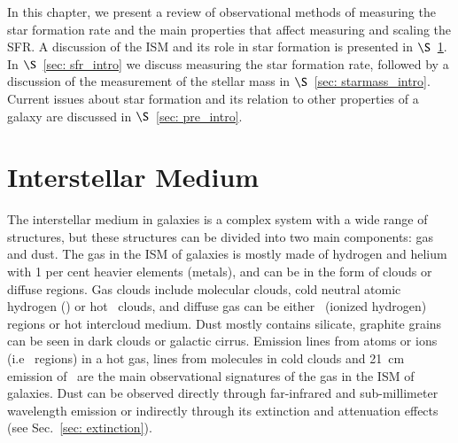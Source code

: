 In this chapter, we present a review of observational methods of measuring the star formation rate and the main properties that affect measuring and scaling the SFR. A discussion of the ISM and its role in star formation is presented in $\S$~\ref{sec: ism_intro}. In $\S$~\ref{sec: sfr_intro} we discuss measuring the star formation rate, followed by a discussion of the measurement of the stellar mass in $\S$~\ref{sec: starmass_intro}. Current issues about star formation and its relation to other properties of a galaxy are discussed in $\S$~\ref{sec: pre_intro}. 





\section{Interstellar Medium} %
\label{sec: ism_intro}
The interstellar medium in galaxies is a complex system with a wide range of structures, but these structures can be divided into two main components: gas and dust. %
The gas in the ISM of galaxies is mostly made of hydrogen and helium with 1 per cent heavier elements (metals), and can be in the form of clouds or diffuse regions.
Gas clouds include molecular clouds, cold neutral atomic hydrogen (\hi) or hot \hi~clouds, and diffuse gas can be either \hii~(ionized hydrogen) regions or hot intercloud medium.
Dust mostly contains silicate, graphite grains can be seen in dark clouds or galactic cirrus.
Emission lines from atoms or ions (i.e \hii~regions) in a hot gas, lines from molecules in cold clouds and 21~cm emission of \hi~are the main observational signatures of the gas in the ISM of galaxies.
Dust can be observed directly through far-infrared and sub-millimeter wavelength emission or indirectly through its extinction and attenuation effects (see Sec.~\ref{sec: extinction}).

